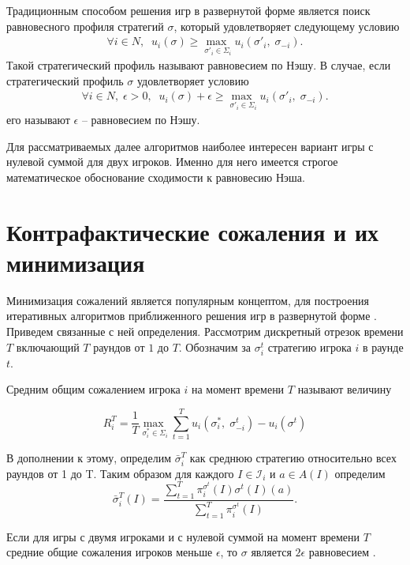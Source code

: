 Традиционным способом решения игр в развернутой форме является поиск равновесного профиля стратегий $\sigma$, который удовлетворяет следующему условию 
\begin{equation}
\begin{split}
	\forall i \in N,\;\;u_i(\sigma)\geq \underset{\sigma'_i\in \Sigma_i}{\max\;} u_i(\sigma'_i,\;\sigma_{-i}).
\end{split}
\end{equation} 
Такой стратегический профиль называют равновесием по Нэшу. В случае, если стратегический профиль $\sigma$ удовлетворяет условию 
\begin{equation}
	\begin{split}
		\forall i \in N,\; \epsilon > 0, \;\;u_i(\sigma) + \epsilon \geq \underset{\sigma'_i\in \Sigma_i}{\max\;} u_i(\sigma'_i,\;\sigma_{-i}).
	\end{split}
\end{equation}
его называют $\epsilon$ – равновесием по Нэшу.
\par
Для рассматриваемых далее алгоритмов наиболее интересен вариант игры с нулевой суммой для двух игроков. Именно для него имеется строгое математическое обоснование сходимости к равновесию Нэша.

\section{Контрафактические сожаления и их минимизация}

Минимизация сожалений является популярным концептом, для построения итеративных алгоритмов приближенного решения игр в развернутой форме \cite{RegretMatching}. Приведем связанные с ней определения. Рассмотрим дискретный отрезок времени $T$ включающий $T$ раундов от $1$ до $T$. Обозначим за $\sigma_i^t$ стратегию игрока $i$ в раунде $t$. 
\begin{defin}
	Средним общим сожалением игрока $i$ на момент времени $T$ называют величину 
\end{defin}
\begin{equation}
	R_i^T=\frac{1}{T} \underset{\sigma_i^*\in \Sigma_i}{\max\;}\sum_{t=1}^{T}u_i(\sigma_i^* ,\;\sigma_{-i}^t)-u_i(\sigma^t)
\end{equation} 

В дополнении к этому, определим $\bar{\sigma}_i^T$ как среднюю стратегию относительно всех раундов от 1 до T. Таким образом для каждого $I \in \mathcal{I}_i$ и $a\in A(I)$ определим 
\begin{equation}
	\bar{\sigma}_i^T(I)=\frac{\sum^T_{t=1}\pi_i^{\sigma^t}(I)\sigma^t(I)(a)}{\sum_{t=1}^{T}\pi_i^{\sigma^t}(I)}.
\end{equation}
\begin{theo} Если для игры с двумя игроками и с нулевой суммой на момент времени $T$ средние общие сожаления игроков меньше $\epsilon$, то $\sigma$ является $2\epsilon$ равновесием \cite{NIPS07cfr}. 
\end{theo}

